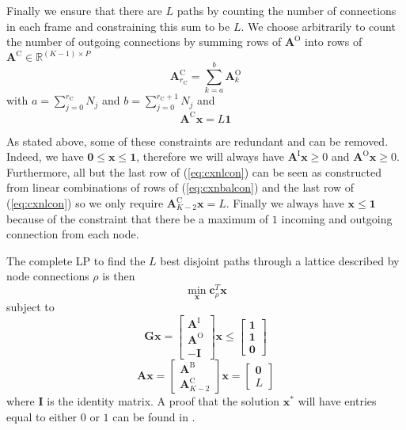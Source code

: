 \documentclass{article}
\newcommand{\cLP}{\boldsymbol{c}_{\rho}}
\newcommand{\BS}[1]{\boldsymbol{#1}}
\begin{document}
\begin{sloppy}
Finally we ensure that there are $L$ paths by counting the number of connections
in each frame and constraining this sum to be $L$. We choose arbitrarily to
count the number of outgoing connections by summing rows of $\BS{A}^{\text{O}}$
into rows of $\BS{A}^{\text{C}} \in \mathbb{R}^{(K-1) \times P}$
\begin{equation}
    \BS{A}^{\text{C}}_{r_{\text{C}}} = \sum_{k=a}^{b} \BS{A}^{\text{O}}_{k}
\end{equation}
with $a = \sum_{j=0}^{r_{\text{C}}} N_{j}$ and $b = \sum_{j=0}^{r_{\text{C}}+1}
N_{j}$ and
\begin{equation}
    \label{eq:cxnlcon}
    \BS{A}^{\text{C}}\BS{x} = L\BS{1}
\end{equation}

As stated above, some of these constraints are redundant and can be removed.
Indeed, we have $\BS{0} \leq \BS{x} \leq \BS{1}$, therefore we will always have
$\BS{A}^{\text{I}}\BS{x} \geq 0$ and $\BS{A}^{\text{O}}\BS{x} \geq 0$.
Furthermore, all but the last row of (\ref{eq:cxnlcon}) can be seen as
constructed from linear combinations of rows of (\ref{eq:cxnbalcon}) and the last
row of (\ref{eq:cxnlcon}) so we only require $\BS{A}^{\text{C}}_{K-2}\BS{x} = L$.
Finally we always have $\BS{x} \leq \BS{1}$ because of the constraint that there
be a maximum of $1$ incoming and outgoing connection from each node.

The complete LP to find the $L$ best disjoint paths through a lattice described
by node connections $\rho$ is then
\[
    \min_{\BS{x}} \cLP^{T} \BS{x} 
\]
subject to
\[
    \BS{G}\BS{x} =
    \begin{bmatrix}
        \BS{A}^{\text{I}} \\
        \BS{A}^{\text{O}} \\
        -\BS{I}
    \end{bmatrix} \BS{x} \leq
    \begin{bmatrix}
        \BS{1} \\
        \BS{1} \\
        \BS{0}
    \end{bmatrix}
\]
\begin{equation}
    \label{eq:lpprogfull}
    \BS{A}\BS{x} =
    \begin{bmatrix}
        \BS{A}^{\text{B}} \\
        \BS{A}^{\text{C}}_{K-2}
    \end{bmatrix} \BS{x} = 
    \begin{bmatrix}
        \BS{0} \\
        L
    \end{bmatrix}
\end{equation}
where $\BS{I}$ is the identity matrix. A proof that the solution
$\boldsymbol{x}^{\ast}$ will have entries equal to either $0$ or $1$ can be
found in \cite[p.~167]{parker1988discrete}.  


\end{sloppy}
\end{document}
